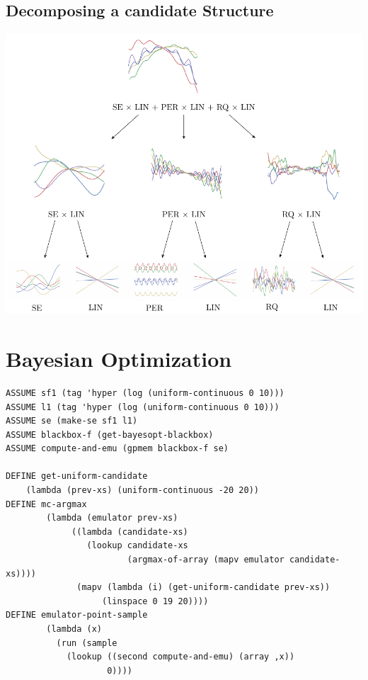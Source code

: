 \documentclass[a0,portrait]{a0poster}
\begin{document}
\begin{multicols}{3}
\subsection*{Decomposing a candidate Structure}
\begin{center}\vspace{1cm}
\includegraphics[width=0.7\linewidth]{parseTree.pdf}
\end{center}\vspace{1cm}
 
\vfill
\columnbreak
\section*{Bayesian Optimization}

\begin{minipage}{\linewidth}
\begin{lstlisting}[frame=single,label=alg:structureVent,caption=Venture Code for Bayesian Optimization,mathescape]
ASSUME sf1 (tag 'hyper (log (uniform-continuous 0 10)))
ASSUME l1 (tag 'hyper (log (uniform-continuous 0 10)))
ASSUME se (make-se sf1 l1)
ASSUME blackbox-f (get-bayesopt-blackbox)
ASSUME compute-and-emu (gpmem blackbox-f se)

DEFINE get-uniform-candidate 
	(lambda (prev-xs) (uniform-continuous -20 20))
DEFINE mc-argmax
        (lambda (emulator prev-xs)
             ((lambda (candidate-xs)
                (lookup candidate-xs
                        (argmax-of-array (mapv emulator candidate-xs))))
              (mapv (lambda (i) (get-uniform-candidate prev-xs))
                   (linspace 0 19 20))))
DEFINE emulator-point-sample
        (lambda (x)
          (run (sample
            (lookup ((second compute-and-emu) (array ,x))
                    0))))


\end{lstlisting}
\end{minipage}
\end{multicols}
\end{document}
